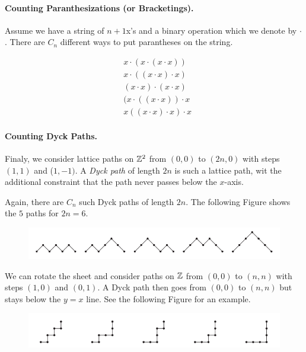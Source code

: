\paragraph{Counting Paranthesizations (or Bracketings).} Assume we have a string of $n+1$x's and a binary operation which we denote by $\cdot$. There are $C_n$ different ways to put parantheses on the string.

\begin{align*}
  &x \cdot (x\cdot (x\cdot x)) \\
  &x \cdot ((x\cdot x) \cdot x) \\
  &(x\cdot x)\cdot (x\cdot x) \\
  &(x \cdot ((x\cdot x))\cdot x \\
  &x((x\cdot x) \cdot x) \cdot x
\end{align*}

\paragraph{Counting Dyck Paths.} Finaly, we consider lattice paths on $\mathbb{Z}^2$ from $(0,0)$ to $(2n,0)$ with steps $(1,1)$ and ($1,-1)$. A \emph{Dyck path} of length $2n$ is such a lattice path, wit the additional constraint that the path never passes below the $x$-axis.

Again, there are $C_n$ such Dyck paths of length $2n$. The following Figure shows the $5$ paths for $2n=6$.

\begin{figure}[H]
\centering
\includegraphics[scale=0.5]{images/2022-06-15-catalan_11.png}
\end{figure}

We can rotate the sheet and consider paths on $\mathbb{Z}$ from $(0,0)$ to $(n,n)$ with steps $(1,0)$ and $(0,1)$. A Dyck path then goes from $(0,0)$ to $(n,n)$ but stays below the $y=x$ line. See the following Figure for an example.

\begin{figure}[H]
\centering
\includegraphics[scale=0.5]{images/2022-06-15-catalan_12.png}
\end{figure}

